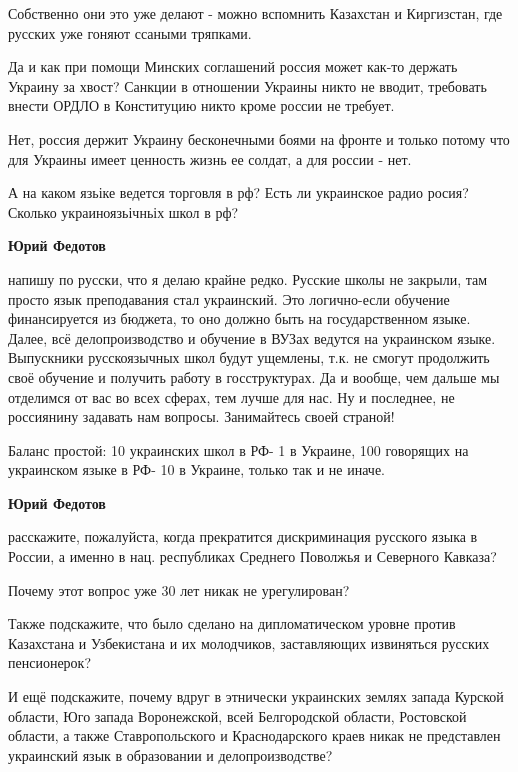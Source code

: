 \begin{itemize}
\begin{itemize}
Собственно они это уже делают - можно вспомнить Казахстан и Киргизстан, где
русских уже гоняют ссаными тряпками.

Да и как при помощи Минских соглашений россия может как-то держать Украину за
хвост? Санкции в отношении Украины никто не вводит, требовать внести ОРДЛО в
Конституцию никто кроме россии не требует.

Нет, россия держит Украину бесконечными боями на фронте и только потому что для
Украины имеет ценность жизнь ее солдат, а для россии - нет.


А на каком язьіке ведется торговля в рф? Есть ли украинское радио росия?
Сколько украиноязьічньіх школ в рф?


\textbf{Юрий Федотов} 

\obeycr
напишу по русски, что я делаю крайне редко.
Русские школы не закрыли, там просто язык преподавания стал украинский.
Это логично-если обучение финансируется из бюджета, то оно должно быть на государственном языке.
Далее, всё делопроизводство и обучение в ВУЗах ведутся на украинском языке.
Выпускники русскоязычных школ будут ущемлены, т.к. не смогут продолжить своё обучение и получить работу в госструктурах.
Да и вообще, чем дальше мы отделимся от вас во всех сферах, тем лучше для нас.
Ну и последнее, не россиянину задавать нам вопросы.
Занимайтесь своей страной!
\restorecr


Баланс простой: 10 украинских школ в РФ- 1 в Украине, 100 говорящих на
украинском языке в РФ- 10 в Украине, только так и не иначе.


\textbf{Юрий Федотов} 

расскажите, пожалуйста, когда прекратится дискриминация русского языка в
России, а именно в нац. республиках Среднего Поволжья и Северного Кавказа?

Почему этот вопрос уже 30 лет никак не урегулирован?

Также подскажите, что было сделано на дипломатическом уровне против Казахстана
и Узбекистана и их молодчиков, заставляющих извиняться русских пенсионерок?

И ещё подскажите, почему вдруг в этнически украинских землях запада Курской
области, Юго запада Воронежской, всей Белгородской области, Ростовской области,
а также Ставропольского и Краснодарского краев никак не представлен украинский
язык в образовании и делопроизводстве?


\end{itemize}
\end{itemize}
